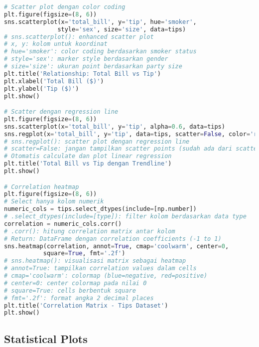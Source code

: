 \begin{lstlisting}[language=python, caption={Scatter Plot dan Correlation}, style=python]
# Scatter plot dengan color coding
plt.figure(figsize=(8, 6))
sns.scatterplot(x='total_bill', y='tip', hue='smoker',
               style='sex', size='size', data=tips)
# sns.scatterplot(): enhanced scatter plot
# x, y: kolom untuk koordinat
# hue='smoker': color coding berdasarkan smoker status
# style='sex': marker style berdasarkan gender
# size='size': ukuran point berdasarkan party size
plt.title('Relationship: Total Bill vs Tip')
plt.xlabel('Total Bill ($)')
plt.ylabel('Tip ($)')
plt.show()

# Scatter dengan regression line
plt.figure(figsize=(8, 6))
sns.scatterplot(x='total_bill', y='tip', alpha=0.6, data=tips)
sns.regplot(x='total_bill', y='tip', data=tips, scatter=False, color='red')
# sns.regplot(): scatter plot dengan regression line
# scatter=False: jangan tampilkan scatter points (sudah ada dari scatterplot)
# Otomatis calculate dan plot linear regression
plt.title('Total Bill vs Tip dengan Trendline')
plt.show()

# Correlation heatmap
plt.figure(figsize=(8, 6))
# Select hanya kolom numerik
numeric_cols = tips.select_dtypes(include=[np.number])
# .select_dtypes(include=[type]): filter kolom berdasarkan data type
correlation = numeric_cols.corr()
# .corr(): hitung correlation matrix antar kolom
# Return: DataFrame dengan correlation coefficients (-1 to 1)
sns.heatmap(correlation, annot=True, cmap='coolwarm', center=0,
           square=True, fmt='.2f')
# sns.heatmap(): visualisasi matrix sebagai heatmap
# annot=True: tampilkan correlation values dalam cells
# cmap='coolwarm': colormap (blue=negative, red=positive)
# center=0: center colormap pada nilai 0
# square=True: cells berbentuk square
# fmt='.2f': format angka 2 decimal places
plt.title('Correlation Matrix - Tips Dataset')
plt.show()
\end{lstlisting}

\subsection*{Statistical Plots}

